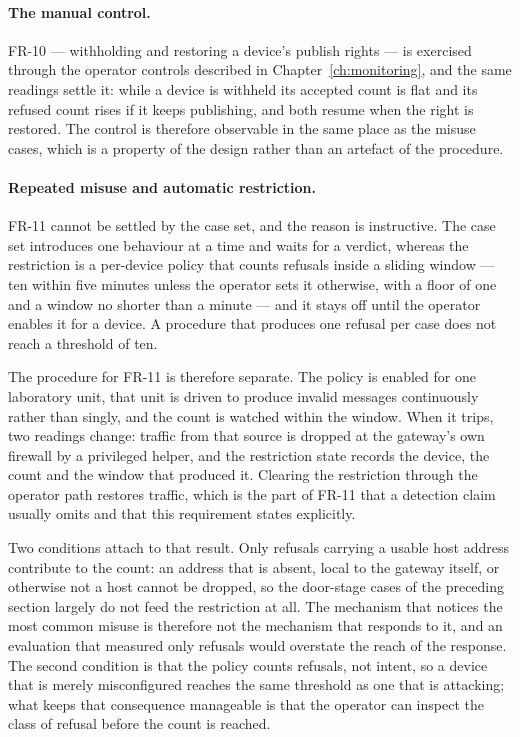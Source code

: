\documentclass[12pt,a4paper]{report}
\begin{document}
\paragraph{The manual control.}
FR-10 --- withholding and restoring a device's publish
rights --- is exercised through the operator controls
described in Chapter~\ref{ch:monitoring}, and the same
readings settle it: while a device is withheld its accepted
count is flat and its refused count rises if it keeps
publishing, and both resume when the right is restored. The
control is therefore observable in the same place as the
misuse cases, which is a property of the design rather than
an artefact of the procedure.

\paragraph{Repeated misuse and automatic restriction.}
FR-11 cannot be settled by the case set, and the reason is
instructive. The case set introduces one behaviour at a time
and waits for a verdict, whereas the restriction is a
per-device policy that counts refusals inside a sliding
window --- ten within five minutes unless the operator sets
it otherwise, with a floor of one and a window no shorter
than a minute --- and it stays off until the operator enables
it for a device. A procedure that produces one refusal per
case does not reach a threshold of ten.

The procedure for FR-11 is therefore separate. The policy is
enabled for one laboratory unit, that unit is driven to
produce invalid messages continuously rather than singly, and
the count is watched within the window. When it trips, two
readings change: traffic from that source is dropped at the
gateway's own firewall by a privileged helper, and the
restriction state records the device, the count and the
window that produced it. Clearing the restriction through the
operator path restores traffic, which is the part of FR-11
that a detection claim usually omits and that this requirement
states explicitly.

Two conditions attach to that result. Only refusals carrying
a usable host address contribute to the count: an address
that is absent, local to the gateway itself, or otherwise not
a host cannot be dropped, so the door-stage cases of the
preceding section largely do not feed the restriction at
all. The mechanism that notices the most common misuse is
therefore not the mechanism that responds to it, and an
evaluation that measured only refusals would overstate the
reach of the response. The second condition is that the
policy counts refusals, not intent, so a device that is
merely misconfigured reaches the same threshold as one that
is attacking; what keeps that consequence manageable is that
the operator can inspect the class of refusal before the
count is reached.
\end{document}
